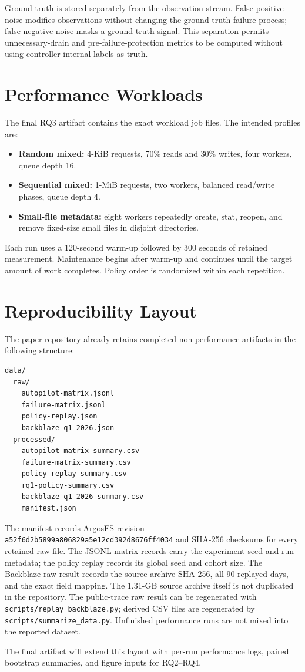 Ground truth is stored separately from the observation stream. False-positive noise modifies observations without changing the ground-truth failure process; false-negative noise masks a ground-truth signal. This separation permits unnecessary-drain and pre-failure-protection metrics to be computed without using controller-internal labels as truth.

\section{Performance Workloads}
\label{app:performance}

The final RQ3 artifact contains the exact workload job files. The intended profiles are:
\begin{itemize}[leftmargin=*]
  \item \textbf{Random mixed:} 4-KiB requests, 70\% reads and 30\% writes, four workers, queue depth 16.
  \item \textbf{Sequential mixed:} 1-MiB requests, two workers, balanced read/write phases, queue depth 4.
  \item \textbf{Small-file metadata:} eight workers repeatedly create, stat, reopen, and remove fixed-size small files in disjoint directories.
\end{itemize}
Each run uses a 120-second warm-up followed by 300 seconds of retained measurement. Maintenance begins after warm-up and continues until the target amount of work completes. Policy order is randomized within each repetition.

\section{Reproducibility Layout}
\label{app:reproducibility}

The paper repository already retains completed non-performance artifacts in the following structure:
\begin{verbatim}
data/
  raw/
    autopilot-matrix.jsonl
    failure-matrix.jsonl
    policy-replay.json
    backblaze-q1-2026.json
  processed/
    autopilot-matrix-summary.csv
    failure-matrix-summary.csv
    policy-replay-summary.csv
    rq1-policy-summary.csv
    backblaze-q1-2026-summary.csv
    manifest.json
\end{verbatim}
The manifest records ArgosFS revision \texttt{a52f6d2b5899a806829a5e12cd392d8676ff4034} and SHA-256 checksums for every retained raw file. The JSONL matrix records carry the experiment seed and run metadata; the policy replay records its global seed and cohort size. The Backblaze raw result records the source-archive SHA-256, all 90 replayed days, and the exact field mapping. The 1.31-GB source archive itself is not duplicated in the repository. The public-trace raw result can be regenerated with \texttt{scripts/replay\_backblaze.py}; derived CSV files are regenerated by \texttt{scripts/summarize\_data.py}. Unfinished performance runs are not mixed into the reported dataset.

The final artifact will extend this layout with per-run performance logs, paired bootstrap summaries, and figure inputs for RQ2--RQ4.
